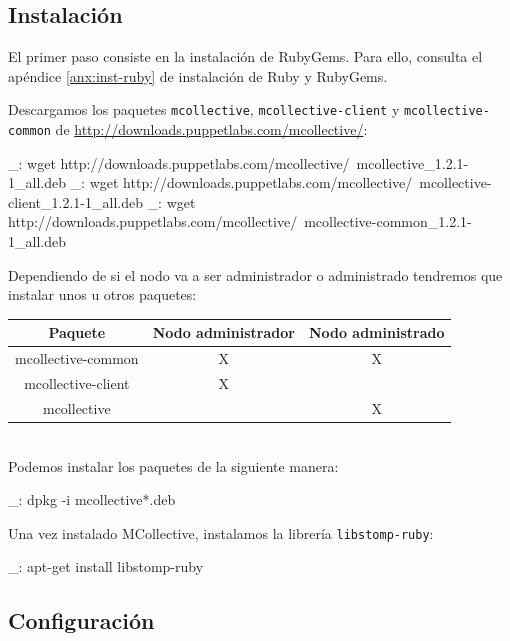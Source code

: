 \subsection{Instalación}

El primer paso consiste en la instalación de RubyGems. Para ello, consulta el apéndice \ref{anx:inst-ruby} de instalación de Ruby y RubyGems.

Descargamos los paquetes \texttt{mcollective}, \texttt{mcollective-client} y \texttt{mcollective-common} de \url{http://downloads.puppetlabs.com/mcollective/}:

\begin{bashcode}
_: wget http://downloads.puppetlabs.com/mcollective/\
mcollective_1.2.1-1_all.deb
_: wget http://downloads.puppetlabs.com/mcollective/\
mcollective-client_1.2.1-1_all.deb
_: wget http://downloads.puppetlabs.com/mcollective/\
mcollective-common_1.2.1-1_all.deb
\end{bashcode}

Dependiendo de si el nodo va a ser administrador o administrado tendremos que instalar unos u otros paquetes:

\begin{tabular}{|c|c|c|}
   \hline
   Paquete & Nodo administrador & Nodo administrado \\ \hline
   mcollective-common & X & X \\ \hline
   mcollective-client & X &   \\ \hline
   mcollective &  & X \\ \hline
\end{tabular}
\\

Podemos instalar los paquetes de la siguiente manera:

\begin{bashcode}
_: dpkg -i mcollective*.deb
\end{bashcode}

Una vez instalado MCollective, instalamos la librería \texttt{libstomp-ruby}:

\begin{bashcode}
_: apt-get install libstomp-ruby
\end{bashcode}


\subsection{Configuración}

